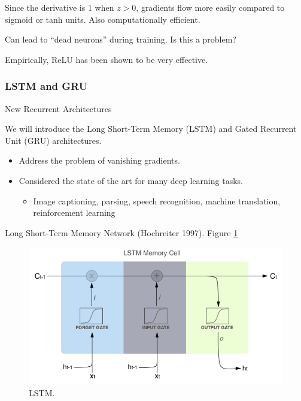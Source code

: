 \documentclass[english]{article}
\begin{document}
Since the derivative is 1 when $z>0$, gradients flow more easily compared to sigmoid or tanh units. Also computationally efficient.  

Can lead to ``dead neurons'' during training. Is this a problem? 

Empirically, ReLU has been shown to be very effective.

 \eenum

\subsubsection{LSTM and GRU}
\benum
\item 
 {New Recurrent Architectures}

We will introduce the Long Short-Term Memory (LSTM) and Gated Recurrent Unit (GRU) architectures. 
\begin{itemize}
\item Address the problem of vanishing gradients.
\item Considered the state of the art for many deep learning tasks.
\begin{itemize}
\item Image captioning, parsing, speech recognition, machine translation, reinforcement learning
\end{itemize}
\end{itemize}
 

\item 
 {Long Short-Term Memory Network (Hochreiter 1997)}.  Figure \ref{LSTM}

\begin{figure}
\centering
\includegraphics[height=0.33\linewidth]{lstm-cell.png}
    \caption{LSTM.}
    \label{LSTM}
\end{figure}
\end{document}
